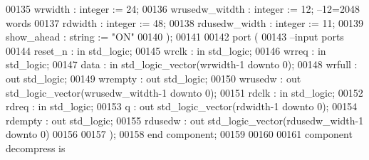 \begin{DoxyCode}
00135           wrwidth         : \textcolor{comment}{integer} := \textcolor{vhdllogic}{}\textcolor{vhdllogic}{24};
00136           wrusedw_witdth  : \textcolor{comment}{integer} := \textcolor{vhdllogic}{}\textcolor{vhdllogic}{12}; \textcolor{keyword}{--12=2048 words }
00137           rdwidth         : \textcolor{comment}{integer} := \textcolor{vhdllogic}{}\textcolor{vhdllogic}{48};
00138           rdusedw_width   : \textcolor{comment}{integer} := \textcolor{vhdllogic}{}\textcolor{vhdllogic}{11};
00139           show_ahead      : \textcolor{comment}{string}  := \textcolor{keyword}{"ON"}
00140   );  
00141 
00142   \textcolor{keywordflow}{port} (
00143 \textcolor{keyword}{      --input ports }
00144       reset_n       : \textcolor{keywordflow}{in} \textcolor{comment}{std\_logic};
00145       wrclk         : \textcolor{keywordflow}{in} \textcolor{comment}{std\_logic};
00146       wrreq         : \textcolor{keywordflow}{in} \textcolor{comment}{std\_logic};
00147       data          : \textcolor{keywordflow}{in} \textcolor{comment}{std\_logic\_vector}(wrwidth\textcolor{vhdlchar}{-}\textcolor{vhdllogic}{}\textcolor{vhdllogic}{1} \textcolor{keywordflow}{downto} \textcolor{vhdllogic}{}\textcolor{vhdllogic}{0});
00148       wrfull        : \textcolor{keywordflow}{out} \textcolor{comment}{std\_logic};
00149         wrempty       : \textcolor{keywordflow}{out} \textcolor{comment}{std\_logic};
00150       wrusedw       : \textcolor{keywordflow}{out} \textcolor{comment}{std\_logic\_vector}(wrusedw_witdth\textcolor{vhdlchar}{-}\textcolor{vhdllogic}{}\textcolor{vhdllogic}{1} \textcolor{keywordflow}{downto} \textcolor{vhdllogic}{}\textcolor{vhdllogic}{0});
00151       rdclk          : \textcolor{keywordflow}{in} \textcolor{comment}{std\_logic};
00152       rdreq         : \textcolor{keywordflow}{in} \textcolor{comment}{std\_logic};
00153       q             : \textcolor{keywordflow}{out} \textcolor{comment}{std\_logic\_vector}(rdwidth\textcolor{vhdlchar}{-}\textcolor{vhdllogic}{}\textcolor{vhdllogic}{1} \textcolor{keywordflow}{downto} \textcolor{vhdllogic}{}\textcolor{vhdllogic}{0});
00154       rdempty       : \textcolor{keywordflow}{out} \textcolor{comment}{std\_logic};
00155       rdusedw       : \textcolor{keywordflow}{out} \textcolor{comment}{std\_logic\_vector}(rdusedw_width\textcolor{vhdlchar}{-}\textcolor{vhdllogic}{}\textcolor{vhdllogic}{1} \textcolor{keywordflow}{downto} \textcolor{vhdllogic}{}\textcolor{vhdllogic}{0})     
00156         
00157         );
00158 \textcolor{keywordflow}{end} \textcolor{keywordflow}{component};
00159 
00160 
00161 \textcolor{keywordflow}{component} decompress \textcolor{keywordflow}{is}

\end{DoxyCode}
